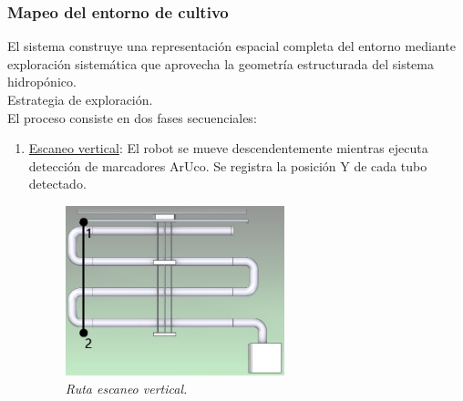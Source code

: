 \subsubsection{Mapeo del entorno de cultivo}

El sistema construye una representación espacial completa del entorno mediante exploración sistemática que aprovecha la geometría estructurada del sistema hidropónico.\\

Estrategia de exploración.\\
\noindent 
El proceso consiste en dos fases secuenciales:

\begin{enumerate}
    \item \underline{Escaneo vertical}: El robot se mueve descendentemente mientras ejecuta detección de marcadores ArUco. Se registra la posición Y de cada tubo detectado.

    \begin{figure}[H]
        \centering
            \includegraphics[width=0.6\textwidth]{imagenes/mov_vertical.jpg}
            \caption{\textit{Ruta escaneo vertical.}}
            \label{fig:estructura1}
    \end{figure}


\end{enumerate}

